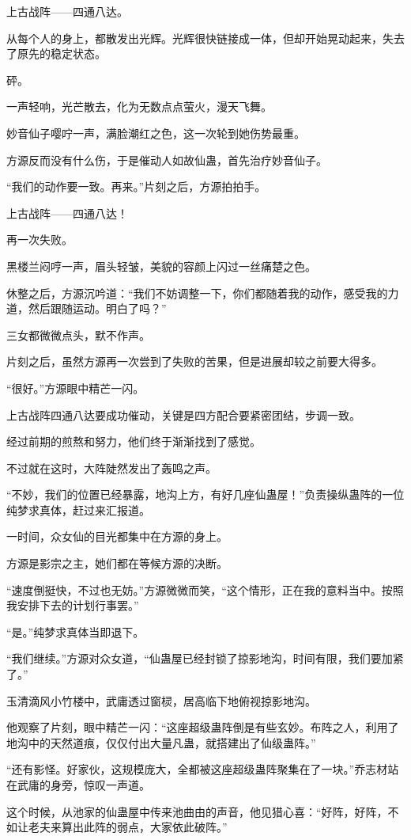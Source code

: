 \begin{this_body}
上古战阵——四通八达。

从每个人的身上，都散发出光辉。光辉很快链接成一体，但却开始晃动起来，失去了原先的稳定状态。

砰。

一声轻响，光芒散去，化为无数点点萤火，漫天飞舞。

妙音仙子嘤咛一声，满脸潮红之色，这一次轮到她伤势最重。

方源反而没有什么伤，于是催动人如故仙蛊，首先治疗妙音仙子。

“我们的动作要一致。再来。”片刻之后，方源拍拍手。

上古战阵——四通八达！

再一次失败。

黑楼兰闷哼一声，眉头轻皱，美貌的容颜上闪过一丝痛楚之色。

休整之后，方源沉吟道：“我们不妨调整一下，你们都随着我的动作，感受我的力道，然后跟随运动。明白了吗？”

三女都微微点头，默不作声。

片刻之后，虽然方源再一次尝到了失败的苦果，但是进展却较之前要大得多。

“很好。”方源眼中精芒一闪。

上古战阵四通八达要成功催动，关键是四方配合要紧密团结，步调一致。

经过前期的煎熬和努力，他们终于渐渐找到了感觉。

不过就在这时，大阵陡然发出了轰鸣之声。

“不妙，我们的位置已经暴露，地沟上方，有好几座仙蛊屋！”负责操纵蛊阵的一位纯梦求真体，赶过来汇报道。

一时间，众女仙的目光都集中在方源的身上。

方源是影宗之主，她们都在等候方源的决断。

“速度倒挺快，不过也无妨。”方源微微而笑，“这个情形，正在我的意料当中。按照我安排下去的计划行事罢。”

“是。”纯梦求真体当即退下。

“我们继续。”方源对众女道，“仙蛊屋已经封锁了掠影地沟，时间有限，我们要加紧了。”

玉清滴风小竹楼中，武庸透过窗棂，居高临下地俯视掠影地沟。

他观察了片刻，眼中精芒一闪：“这座超级蛊阵倒是有些玄妙。布阵之人，利用了地沟中的天然道痕，仅仅付出大量凡蛊，就搭建出了仙级蛊阵。”

“还有影怪。好家伙，这规模庞大，全都被这座超级蛊阵聚集在了一块。”乔志材站在武庸的身旁，惊叹一声道。

这个时候，从池家的仙蛊屋中传来池曲由的声音，他见猎心喜：“好阵，好阵，不如让老夫来算出此阵的弱点，大家依此破阵。”


\end{this_body}
